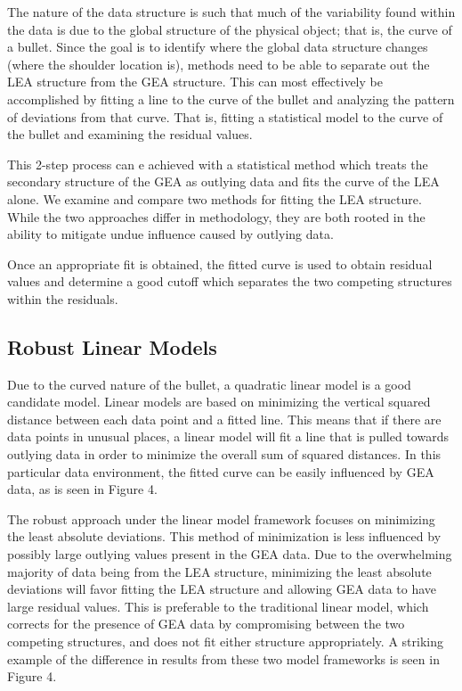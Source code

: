 \documentclass[]{article}
\begin{document}
The nature of the data structure is such that much of the variability
found within the data is due to the global structure of the physical
object; that is, the curve of a bullet. Since the goal is to identify
where the global data structure changes (where the shoulder location
is), methods need to be able to separate out the LEA structure from the
GEA structure. This can most effectively be accomplished by fitting a
line to the curve of the bullet and analyzing the pattern of deviations
from that curve. That is, fitting a statistical model to the curve of
the bullet and examining the residual values.

This 2-step process can e achieved with a statistical method which
treats the secondary structure of the GEA as outlying data and fits the
curve of the LEA alone. We examine and compare two methods for fitting
the LEA structure. While the two approaches differ in methodology, they
are both rooted in the ability to mitigate undue influence caused by
outlying data.

Once an appropriate fit is obtained, the fitted curve is used to obtain
residual values and determine a good cutoff which separates the two
competing structures within the residuals.

\subsection{Robust Linear Models}

Due to the curved nature of the bullet, a quadratic linear model is a
good candidate model. Linear models are based on minimizing the vertical
squared distance between each data point and a fitted line. This means
that if there are data points in unusual places, a linear model will fit
a line that is pulled towards outlying data in order to minimize the
overall sum of squared distances. In this particular data environment,
the fitted curve can be easily influenced by GEA data, as is seen in
Figure 4.

The robust approach under the linear model framework focuses on
minimizing the least absolute deviations. This method of minimization is
less influenced by possibly large outlying values present in the GEA
data. Due to the overwhelming majority of data being from the LEA
structure, minimizing the least absolute deviations will favor fitting
the LEA structure and allowing GEA data to have large residual values.
This is preferable to the traditional linear model, which corrects for
the presence of GEA data by compromising between the two competing
structures, and does not fit either structure appropriately. A striking
example of the difference in results from these two model frameworks is
seen in Figure 4.
\end{document}
